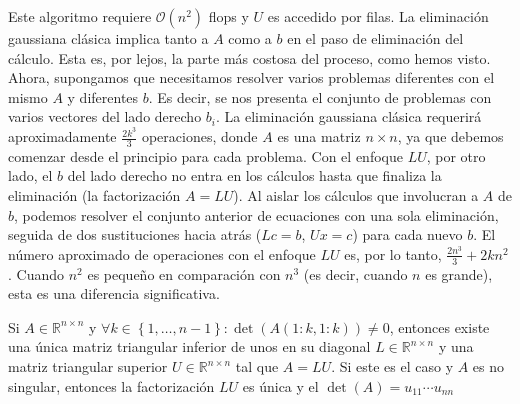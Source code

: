 Este algoritmo requiere $\mathcal{O}\left(n^{2}\right)$ flops y $U$
es accedido por filas.
La eliminación gaussiana clásica implica tanto a $A$ como a $b$ en el
paso de eliminación del cálculo.
Esta es, por lejos, la parte más costosa del proceso, como hemos
visto.
Ahora, supongamos que necesitamos resolver varios problemas
diferentes con el mismo $A$ y diferentes $b$.
Es decir, se nos presenta el conjunto de problemas con varios
vectores del lado derecho $b_{i}$.
La eliminación gaussiana clásica requerirá aproximadamente
$\frac{2k^{3}}{3}$ operaciones, donde $A$ es una matriz $n\times n$,
ya que debemos comenzar desde el principio para cada problema.
Con el enfoque $LU$, por otro lado, el $b$ del lado derecho no entra
en los cálculos hasta que finaliza la eliminación (la factorización
$A=LU$).
Al aislar los cálculos que involucran a $A$ de $b$, podemos resolver
el conjunto anterior de ecuaciones con una sola eliminación, seguida
de dos sustituciones hacia atrás ($Lc=b$, $Ux=c$) para cada nuevo
$b$.
El número aproximado de operaciones con el enfoque $LU$ es, por lo
tanto, $\frac{2n^3}{3}+2kn^{2}$.
Cuando $n^{2}$ es pequeño en comparación con $n^{3}$ (es decir,
cuando $n$ es grande), esta es una diferencia significativa.

\begin{theorem}
    Si $A\in\mathbb{R}^{n\times n}$ y
    \begin{math}
        \forall k\in\left\{1,\dotsc,n-1\right\}:
        \det\left(A\left(1:k,1:k\right)\right)\neq 0
    \end{math},
    entonces existe una única matriz triangular inferior de unos en
    su diagonal $L\in\mathbb{R}^{n\times n}$ y una matriz triangular
    superior $U\in\mathbb{R}^{n\times n}$ tal que $A=LU$.
    Si este es el caso y $A$ es no singular, entonces la
    factorización $LU$ es única y el
    $\det\left(A\right)=u_{11}\cdots u_{nn}$
\end{theorem}

